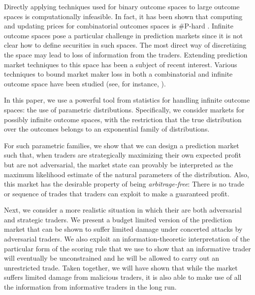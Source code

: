 \documentclass{article}
\begin{document}

Directly applying techniques used for binary outcome spaces to large outcome spaces is computationally infeasible. In fact, it has been shown that computing and updating prices for combinatorial outcomes spaces is $\#$P-hard \cite{Chen08}. Infinite outcome spaces pose a particular challenge in prediction markets since it is not clear how to define securities in such spaces. The most direct way of discretizing the space may lead to loss of information from the traders. Extending prediction market techniques to this space has been a subject of recent interest. Various techniques to bound market maker loss in both a combinatorial and infinite outcome space have been studied (see, for instance, \cite{Abernethy11,OthmanS11}). 

In this paper, we 
use a powerful tool from statistics for handling infinite outcome spaces: the use of parametric distributions.
Specifically, we consider markets for possibly infinite outcome spaces, with the restriction that the true distribution over 
the outcomes belongs to an exponential family of distributions. 

For such parametric families, we show that we can design a prediction market such that, when traders are strategically maximizing their own expected profit but are not adversarial, the market state can provably be interpreted as the maximum likelihood estimate of the natural parameters of the distribution. Also, this market has the desirable property of being {\em arbitrage-free}: There is no trade or sequence of trades that traders can exploit to make a guaranteed profit. 

Next, we consider a more realistic situation in which their are both adversarial and strategic traders. We present a budget limited version of the prediction market that can be shown to suffer limited damage under concerted attacks by adversarial traders. We also exploit an information-theoretic interpretation of the particular form of the scoring rule that we use to show that an informative trader will eventually be unconstrained and he will be allowed to carry out an unrestricted trade. Taken together, we will have shown that while the market suffers limited damage from malicious traders, it is also able to make use of all the information from informative traders in the long run.
\end{document}
